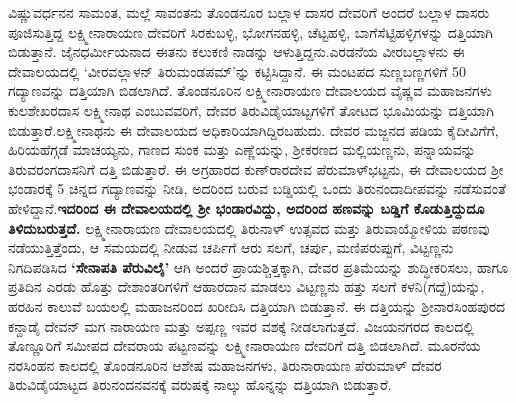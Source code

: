 ವಿಷ್ಣುವರ್ಧನನ ಸಾಮಂತ, ಮಲ್ಲೆ ಸಾವಂತನು ತೊಂಡನೂರ ಬಲ್ಲಾಳ ದಾಸರ ದೇವರಿಗೆ ಅಂದರೆ ಬಲ್ಲಾಳ ದಾಸರು ಪೂಜಿಸುತ್ತಿದ್ದ ಲಕ್ಷ್ಮೀನಾರಾಯಣ ದೇವರಿಗೆ ಸಿರಕುಬಳ್ಳಿ, ಭೋಗನಹಳ್ಳಿ, ಚೆಟ್ಟಹಳ್ಳಿ, ಬಾಗೆಸೆಟ್ಟಿಹಳ್ಳಿಗಳನ್ನು ದತ್ತಿಯಾಗಿ ಬಿಡುತ್ತಾನೆ. ಜೈನಧರ್ಮೀಯನಾದ ಈತನು ಕಲುಕಣಿ ನಾಡನ್ನು ಆಳುತ್ತಿದ್ದನು.ಎರಡನೆಯ ವೀರಬಲ್ಲಾಳನು ಈ ದೇವಾಲಯದಲ್ಲಿ ‘ವೀರವಲ್ಲಾಳನ್​ ತಿರುಮಂಡಪಮ್’ನ್ನು ಕಟ್ಟಿಸಿದ್ದಾನೆ. ಈ ಮಂಟಪದ ಸುಣ್ಣಬಣ್ಣಗಳಿಗೆ 50 ಗದ್ಯಾಣವನ್ನು ದತ್ತಿಯಾಗಿ ಬಿಡಲಾಗಿದೆ. ತೊಂಡನೂರಿನ ಲಕ್ಷ್ಮೀನಾರಾಯಣ ದೇವಾಲಯದ ವೈಷ್ಣವ ಮಹಾಜನಗಳು ಕುಲಶೇಖರದಾಸ ಲಕ್ಷ್ಮೀನಾಥ ಎಂಬುವವರಿಗೆ, ದೇವರ ತಿರುವಿಡೈಯಾಟ್ಟಗಳಿಗೆ ತೋಟದ ಭೂಮಿಯನ್ನು ದತ್ತಿಯಾಗಿ ಬಿಡುತ್ತಾರೆ.\break ಲಕ್ಷ್ಮೀನಾಥನು ಈ ದೇವಾಲಯದ ಅಧಿಕಾರಿಯಾಗಿದ್ದಿರಬಹುದು. ದೇವರ ಮಜ್ಜನದ ಪಡಿಯ ಕೈದೀವಿಗೆಗೆ, ಹಿರಿಯಹೆಗ್ಗಡೆ ಮಾಚಯ್ಯನು, ಗಾಣದ ಸುಂಕ ಮತ್ತು ಎಣ್ಣೆಯನ್ನು, ಶ‍್ರೀಕರಣದ ಮಲ್ಲಿಯಣ್ಣನು, ಪನ್ನಾಯವನ್ನು ತಿರುವರಂಗದಾಸನಿಗೆ ದತ್ತಿ ಬಿಡುತ್ತಾರೆ. ಈ ಅಗ್ರಹಾರದ ಕುಣ್​ರಾರದೇವ ಪೆರುಮಾಳ್​ಭಟ್ಟನು, ಈ ದೇವಾಲಯದ ಶ‍್ರೀ ಭಂಡಾರಕ್ಕೆ 5 ಚಿನ್ನದ ಗದ್ಯಾಣವನ್ನು ನೀಡಿ, ಅದರಿಂದ ಬರುವ ಬಡ್ಡಿಯಲ್ಲಿ ಒಂದು ತಿರುನಂದಾದೀಪವನ್ನು ನಡೆಸುವಂತೆ ಹೇಳಿದ್ದಾನೆ.\textbf{ಇದರಿಂದ ಈ ದೇವಾಲಯದಲ್ಲಿ ಶ‍್ರೀ ಭಂಡಾರವಿದ್ದು, ಅದರಿಂದ ಹಣವನ್ನು ಬಡ್ಡಿಗೆ ಕೊಡುತ್ತಿದ್ದುದೂ ತಿಳಿದುಬರುತ್ತದೆ.} ಲಕ್ಷ್ಮೀನಾರಾಯಣ ದೇವಾಲಯದಲ್ಲಿ ತಿರುನಾಳ್​ ಉತ್ಸವದ ಮತ್ತು ತಿರುವಾಯ್ಮೋಳಿಯ ಪಠಣವು ನಡೆಯುತ್ತಿತ್ತೆಂದು, ಆ ಸಮಯದಲ್ಲಿ ನೀಡುವ ಚರ್ಪಿಗೆ ಆರು ಸಲಗೆ, ಚರ್ಪು, ಮಣಿಪರುಪ್ಪುಗೆ, ವಿಟ್ಟಣ್ಣನು ನಿಗದಿಪಡಿಸಿದ \textbf{‘ಸೇನಾಪತಿ ಪೆರುವಿಲೈ’} ಆಗಿ ಅಂದರೆ ಪ್ರಾಯಶ್ಚಿತ್ತಕ್ಕಾಗಿ, ದೇವರ ಪ್ರತಿಮೆಯನ್ನು ಶುದ್ಧೀಕರಿಸಲು, ಹಾಗೂ ಪ್ರತಿದಿನ ಎರಡು ಹೊತ್ತು ದೇಶಾಂತರಿಗಳಿಗೆ ಆಹಾರದಾನ ಮಾಡಲು ವಿಟ್ಟಣ್ಣನು ಹತ್ತು ಸಲಗೆ ಕಳನಿ(ಗದ್ದೆ)ಯನ್ನು, ಹರಹಿನ ಕಾಲುವೆ ಬಯಲಲ್ಲಿ ಮಹಾಜನರಿಂದ ಖರೀದಿಸಿ ದತ್ತಿಯಾಗಿ ಬಿಡುತ್ತಾನೆ. ಈ ದತ್ತಿಯನ್ನು ಶ‍್ರೀನಾರಸಿಂಹಪುರದ ಕನ್ದಾಡೈ ದೇವನ್​ ಮಗ ನಾರಾಯಣ ಮತ್ತು ಅಪ್ಪಣ್ಣ ಇವರ ವಶಕ್ಕೆ ನೀಡಲಾಗುತ್ತದೆ. ವಿಜಯನಗರದ ಕಾಲದಲ್ಲಿ ತೊಣ್ಣೂರಿಗೆ ಸಮೀಪದ ದೇವರಾಯ ಪಟ್ಟಣವನ್ನು ಲಕ್ಷ್ಮೀನಾರಾಯಣ ದೇವರಿಗೆ ದತ್ತಿ ಬಿಡ\-ಲಾಗಿದೆ. ಮೂರನೆಯ ನರಸಿಂಹನ ಕಾಲದಲ್ಲಿ ತೊಂಡನೂರಿನ ಆಶೇಷ ಮಹಾಜನಗಳು, ತಿರುನಾರಾಯಣ ಪೆರುಮಾಳ್​ ದೇವರ ತಿರುವಿಡೈಯಾಟ್ಟದ ತಿರುನಂದನವನಕ್ಕೆ ವರುಷಕ್ಕೆ ನಾಲ್ಕು ಹೊನ್ನನ್ನು ದತ್ತಿಯಾಗಿ ಬಿಡುತ್ತಾರೆ.

